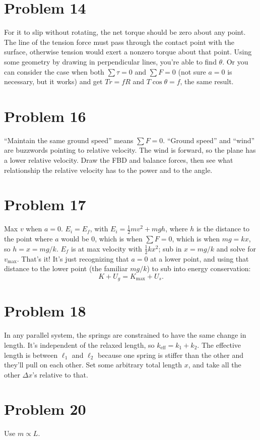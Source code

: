 \documentclass[11pt]{article}
\begin{document}
\section*{Problem 14}
For it to slip without rotating, the net torque should be zero about any point. The line of the tension force must pass through the contact point with the surface, otherwise tension would exert a nonzero torque about that point. Using some geometry by drawing in perpendicular lines, you're able to find $\theta$.
Or you can consider the case when both $\sum\tau=0$ and $\sum F=0$ (not sure $a=0$ is necessary, but it works) and get $Tr=fR$ and $T\cos\theta=f$, the same result.

\section*{Problem 16}
``Maintain the same ground speed'' means $\sum F=0$.
``Ground speed'' and ``wind'' are buzzwords pointing to relative velocity.
The wind is forward, so the plane has a lower relative velocity.
Draw the FBD and balance forces, then see what relationship the relative velocity has to the power and to the angle.

\section*{Problem 17}
Max $v$ when $a=0$.
$E_i=E_f$, with $E_i=\tfrac12mv^2+mgh$, where $h$ is the distance to the point where $a$ would be $0$, which is when $\sum F=0$, which is when $mg=kx$, so $h=x=mg/k$. $E_f$ is at max velocity with $\tfrac12kx^2$; sub in $x=mg/k$ and solve for $v_{\max}$. That's it!
It's just recognizing that $a=0$ at a lower point, and using that distance to the lower point (the familiar $mg/k$) to sub into energy conservation:
\[
K+U_g=K_{\max}+U_s.
\]

\section*{Problem 18}
In any parallel system, the springs are constrained to have the same change in length. It's independent of the relaxed length, so $k_{\text{eff}}=k_1+k_2$.
The effective length is between $\ell_1$ and $\ell_2$ because one spring is stiffer than the other and they'll pull on each other.
Set some arbitrary total length $x$, and take all the other $\Delta x$'s relative to that.

\section*{Problem 20}
Use $m\propto L$.
\end{document}
